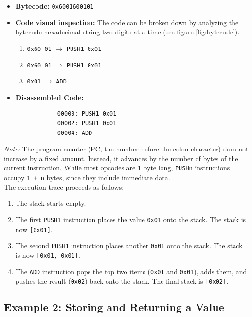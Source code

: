 \documentclass{scrbook}
\begin{document}
\begin{itemize}
    \item \textbf{Bytecode:} \texttt{0x6001600101}
    
    \item \textbf{Code visual inspection:} The code can be broken down by analyzing the bytecode hexadecimal string two digits at a time (see figure \ref{fig:bytecode}).
    \begin{enumerate}
        \item \texttt{0x60 01} $\longrightarrow$ \texttt{PUSH1 0x01}
        \item \texttt{0x60 01} $\longrightarrow$ \texttt{PUSH1 0x01}
        \item \texttt{0x01} $\longrightarrow$ \texttt{ADD}
    \end{enumerate}
    
    \item
        \textbf{Disassembled Code:}
        \begin{lstlisting}
            00000: PUSH1 0x01
            00002: PUSH1 0x01
            00004: ADD
        \end{lstlisting}
\end{itemize}

\noindent
\textit{Note:} The program counter (PC, the number before the colon character) does not increase by a fixed amount. 
Instead, it advances by the number of bytes of the current instruction.
While most opcodes are 1 byte long, \texttt{PUSHn} instructions occupy \texttt{1 + n} bytes, since they include immediate data.\\

The execution trace proceeds as follows:

\begin{enumerate}
    \item The stack starts empty.
    \item The first \texttt{PUSH1} instruction places the value \texttt{0x01} onto the stack. The stack is now \texttt{[0x01]}.
    \item The second \texttt{PUSH1} instruction places another \texttt{0x01} onto the stack. The stack is now \texttt{[0x01, 0x01]}.
    \item The \texttt{ADD} instruction pops the top two items (\texttt{0x01} and \texttt{0x01}), adds them, and pushes the result (\texttt{0x02}) back onto the stack. The final stack is \texttt{[0x02]}.
\end{enumerate}

\subsection{Example 2: Storing and Returning a Value}
\end{document}
